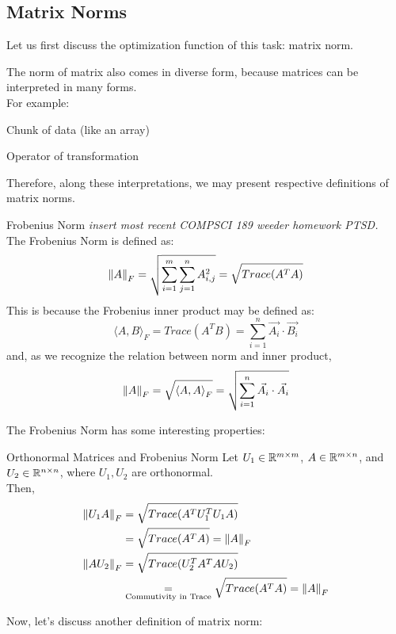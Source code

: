 \subsection{Matrix Norms}
Let us first discuss the optimization function of this task: matrix norm.

The norm of matrix also comes in diverse form, because matrices can be interpreted in many forms. \\
For example:
\begin{bindenum}
    \item Chunk of data (like an array)
    \item Operator of transformation
\end{bindenum}
Therefore, along these interpretations, we may present respective definitions of matrix norms.
\begin{ln-define}{Frobenius Norm}{}
    \textit{insert most recent COMPSCI 189 weeder homework PTSD.} \\
    The Frobenius Norm is defined as:
    \[
        {\| A \|}_{F}^{} = \sqrt{\sum_{i = 1}^m \sum_{j = 1}^n A_{i,j}^2} = \sqrt{Trace(A^T A)}
    \]
    This is because the Frobenius inner product may be defined as:
    \[
        {\langle A, B \rangle}_F = Trace(A^T B) = \sum_{i = 1}^n \vec{A_i} \cdot \vec{B_i}
    \]
    and, as we recognize the relation between norm and inner product,
    \[
        {\| A \|}_{F}^{} = \sqrt{{\langle A, A \rangle}_F} = \sqrt{\sum_{i = 1}^n \vec{A_i} \cdot \vec{A_i}}
    \]
\end{ln-define}
The Frobenius Norm has some interesting properties:
\begin{ln-theorem}{Orthonormal Matrices and Frobenius Norm}{}
    Let $U_1 \in \mathbb{R}^{m \times m}$, $A \in \mathbb{R}^{m \times n}$, and $U_2 \in \mathbb{R}^{n \times n}$, where $U_1, U_2$ are orthonormal. \\
    Then,
    \begin{align*}
        {\| U_1 A \|}_{F}^{}
        &= \sqrt{Trace(A^T U_1^T U_1 A)} \\
        &= \sqrt{Trace(A^T A)} = {\| A \|}_{F}^{} \\
        {\| A U_2 \|}_{F}^{}
        &= \sqrt{Trace(U_2^T A^T A U_2)} \\
        &\underset{\text{Commutivity in Trace}}{=} \sqrt{Trace(A^T A)} = {\| A \|}_{F}^{} \\
    \end{align*}
\end{ln-theorem}
Now, let's discuss another definition of matrix norm:
